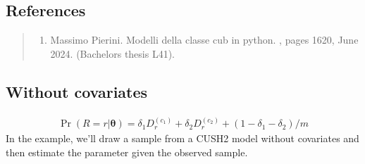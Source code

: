 \documentclass[letterpaper,10pt,english]{sphinxmanual}
\begin{document}
\subsection{References}
\label{\detokenize{manual:id118}}\begin{quote}
\begin{enumerate}
%
\setcounter{enumi}{0}
\item {} 
\sphinxAtStartPar
Massimo Pierini. Modelli della classe cub in python. , pages 16\textendash{}20, June 2024. (Bachelor\textquotesingle{}s thesis L\sphinxhyphen{}41).

\end{enumerate}
\end{quote}


\subsection{Without covariates}
\label{\detokenize{manual:id156}}\begin{equation*}
\begin{split}\Pr(R=r|\pmb\theta) = \delta_1 D_r^{(c_1)} + \delta_2 D_r^{(c_2)} + (1-\delta_1-\delta_2)/m\end{split}
\end{equation*}
\sphinxAtStartPar
In the example, we’ll draw a sample from a CUSH2 model without covariates and
then estimate the parameter given the observed sample.
\end{document}
